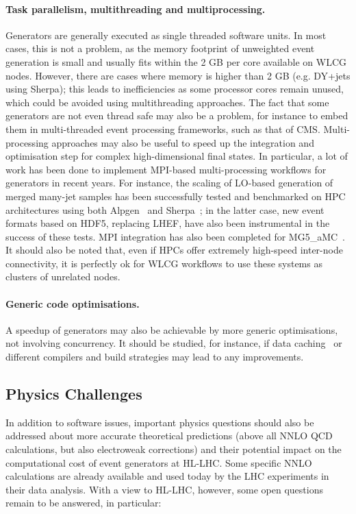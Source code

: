 \paragraph{Task parallelism, multithreading and multiprocessing.} Generators are
generally executed as single threaded software units. In most cases,
this is not a problem, as the memory footprint of unweighted event
generation is small and usually fits within the 2 GB per core available
on WLCG nodes. However, there are cases where memory is higher than 2 GB
(e.g. DY+jets using Sherpa); this leads to inefficiencies as some
processor cores remain unused, which could be avoided using
multithreading approaches. The fact that some generators are not even
thread safe may also be a problem, for instance to embed them in
multi-threaded event processing frameworks, such as that of CMS.
Multi-processing approaches may also be useful to speed up the
integration and optimisation step for complex high-dimensional final
states. In particular, a lot of work has been done to implement
MPI-based multi-processing workflows for generators in recent years. For
instance, the scaling of LO-based generation of merged many-jet samples
has been successfully tested and benchmarked on HPC architectures using
both Alpgen~\cite{Chi17} and Sherpa~\cite{Hoe19}; in the latter case, new
event formats based on HDF5, replacing LHEF, have also been instrumental
in the success of these tests. MPI integration has also been completed
for MG5\_aMC~\cite{Mat18}. It should also be noted that, even if HPCs
offer extremely high-speed inter-node connectivity, it is perfectly ok
for WLCG workflows to use these systems as clusters of unrelated nodes.

\paragraph{Generic code optimisations.} A speedup of generators may also be
achievable by more generic optimisations, not involving concurrency. It
should be studied, for instance, if data caching~\cite{Kon20} or
different compilers and build strategies may lead to any improvements.

\hypertarget{physics-challenges}{%
\subsection{Physics Challenges}\label{physics-challenges}}

In addition to software issues, important physics questions should also
be addressed about more accurate theoretical predictions (above all NNLO
QCD calculations, but also electroweak corrections) and their potential
impact on the computational cost of event generators at HL-LHC. Some
specific NNLO calculations are already available and used today by the
LHC experiments in their data analysis. With a view to HL-LHC, however,
some open questions remain to be answered, in particular:

